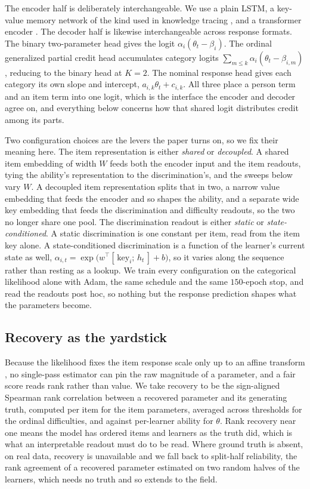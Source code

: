 \documentclass[sigconf,nonacm,screen]{acmart}
\begin{document}
The encoder half is deliberately interchangeable. We use a plain LSTM, a key-value
memory network of the kind used in knowledge tracing \cite{zhang_dynamic_2017}, and
a transformer encoder \cite{vaswani_attention_2017,pandey_self-attentive_2019}. The
decoder half is likewise interchangeable across response formats. The binary
two-parameter head gives the logit $\alpha_i(\theta_t-\beta_i)$. The ordinal
generalized partial credit head \cite{van_der_linden_generalized_1997} accumulates
category logits $\sum_{m\le k}\alpha_i(\theta_t-\beta_{i,m})$, reducing to the
binary head at $K=2$. The nominal response head \cite{bock_estimating_1972} gives
each category its own slope and intercept, $a_{i,k}\theta_t+c_{i,k}$. All three
place a person term and an item term into one logit, which is the interface the
encoder and decoder agree on, and everything below concerns how that shared logit
distributes credit among its parts.

Two configuration choices are the levers the paper turns on, so we fix their meaning
here. The item representation is either \emph{shared} or \emph{decoupled}. A shared
item embedding of width $W$ feeds both the encoder input and the item readouts, tying
the ability's representation to the discrimination's, and the sweeps below vary $W$.
A decoupled item representation splits that in two, a narrow value embedding that
feeds the encoder and so shapes the ability, and a separate wide key embedding that
feeds the discrimination and difficulty readouts, so the two no longer share one
pool. The discrimination readout is either \emph{static} or \emph{state-conditioned}.
A static discrimination is one constant per item, read from the item key alone. A
state-conditioned discrimination is a function of the learner's current state as well,
$\alpha_{i,t}=\exp\bigl(w^\top[\,\text{key}_i;\,h_t\,]+b\bigr)$, so it varies along the
sequence rather than resting as a lookup. We train every configuration on the
categorical likelihood alone with Adam, the same schedule and the same $150$-epoch
stop, and read the readouts post hoc, so nothing but the response prediction shapes
what the parameters become.

\subsection{Recovery as the yardstick}
Because the likelihood fixes the item response scale only up to an affine transform
\cite{baker_item_2004}, no single-pass estimator can pin the raw magnitude of a
parameter, and a fair score reads rank rather than value. We take recovery to be
the sign-aligned Spearman rank correlation between a recovered parameter and its
generating truth, computed per item for the item parameters, averaged across
thresholds for the ordinal difficulties, and against per-learner ability for
$\theta$. Rank recovery near one means the model has ordered items and learners as
the truth did, which is what an interpretable readout must do to be read. Where
ground truth is absent, on real data, recovery is unavailable and we fall back to
split-half reliability, the rank agreement of a recovered parameter estimated on
two random halves of the learners, which needs no truth and so extends to the
field.
\end{document}
